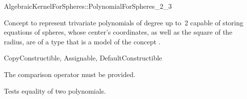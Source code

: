 \begin{ccRefConcept}{AlgebraicKernelForSpheres::PolynomialForSpheres_2_3}

\ccDefinition

Concept to represent
trivariate polynomials of degree up to~2 capable of storing equations
of spheres, whose center's coordinates, as well as the square of the radius, 
are of a type that is a model of the concept
.

\ccRefines
CopyConstructible, Assignable, DefaultConstructible

\ccCreation
{}




\ccOperations

The comparison operator \ccc{==} must be provided. 

{Tests equality of two polynomials.}

\ccHasModels


\ccSeeAlso


\end{ccRefConcept}

